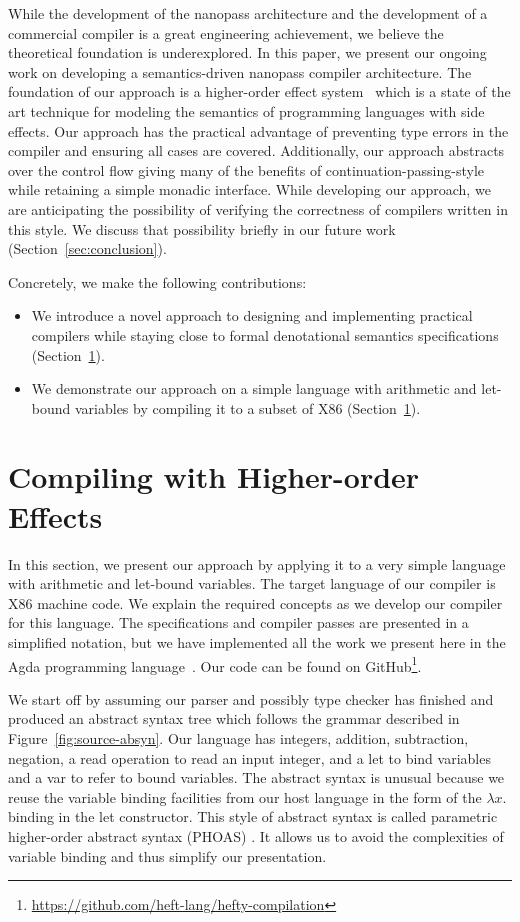 \documentclass[a4paper,UKenglish,cleveref, autoref, thm-restate, anonymous]{oasics-v2021}
\begin{document}
While the development of the nanopass architecture and the development of a commercial compiler is a great engineering achievement, we believe the theoretical foundation is underexplored.
In this paper, we present our ongoing work on developing a semantics-driven nanopass compiler architecture.
The foundation of our approach is a higher-order effect system~\cite{BachPoulsen2022heftyalgebras} which is a state of the art technique for modeling the semantics of programming languages with side effects.
Our approach has the practical advantage of preventing type errors in the compiler and ensuring all cases are covered.
Additionally, our approach abstracts over the control flow giving many of the benefits of continuation-passing-style while retaining a simple monadic interface.
While developing our approach, we are anticipating the possibility of verifying the correctness of compilers written in this style.
We discuss that possibility briefly in our future work (Section~\ref{sec:conclusion}).

\noindent
Concretely, we make the following contributions:
\begin{itemize}
  \item We introduce a novel approach to designing and implementing practical compilers while staying close to formal denotational semantics specifications (Section~\ref{sec:compiling}). 
  \item We demonstrate our approach on a simple language with arithmetic and let-bound variables by compiling it to a subset of X86 (Section~\ref{sec:compiling}).
\end{itemize}

\section{Compiling with Higher-order Effects}\label{sec:compiling}

In this section, we present our approach by applying it to a very simple language with arithmetic and let-bound variables.
The target language of our compiler is X86 machine code.
We explain the required concepts as we develop our compiler for this language.
The specifications and compiler passes are presented in a simplified notation, but we have implemented all the work we present here in the Agda programming language~\cite{10.1007/978-3-642-03359-9_6}.
Our code can be found on GitHub\footnote{\url{https://github.com/heft-lang/hefty-compilation}}.

We start off by assuming our parser and possibly type checker has finished and produced an abstract syntax tree which follows the grammar described in Figure~\ref{fig:source-absyn}.
Our language has integers, addition, subtraction, negation, a read operation to read an input integer, and a let to bind variables and a var to refer to bound variables.
The abstract syntax is unusual because we reuse the variable binding facilities from our host language in the form of the $\lambda x.$ binding in the let constructor.
This style of abstract syntax is called parametric higher-order abstract syntax (PHOAS) \cite{10.1145/1411203.1411226}.
It allows us to avoid the complexities of variable binding and thus simplify our presentation.
\end{document}
